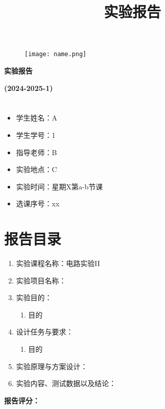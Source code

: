 \documentclass[12pt,a4paper]{ctexart}
\title{实验报告}
\date{}
\begin{document}
\begin{figure}[H]
    \centering
    \texttt{[image: name.png]} %
\end{figure}

\begin{center}
    \begin{Huge}
        \textbf{实\hspace{2cm}验\hspace{2cm}报\hspace{2cm}告}
    \end{Huge}
\end{center}

\begin{center}
    \textbf{(2024-2025-1)}
\end{center}

\section*{}
\begin{itemize}[leftmargin=*]
    \item 学生姓名：A
    \item 学生学号：1
    \item 指导老师：B
    \item 实验地点：C
    \item 实验时间：星期X第a-b节课
    \item 选课序号：xx
\end{itemize}

\section*{报告目录}
\begin{enumerate}[label=\chinese*.]
    \item 实验课程名称：电路实验II
    \item 实验项目名称：\hrulefill %
    \item 实验目的：
        \begin{enumerate}[label=\arabic*.]
            \item 目的
        \end{enumerate}
    \item 设计任务与要求：
        \begin{enumerate}[label=\arabic*.]
            \item 目的
        \end{enumerate}
    \item 实验原理与方案设计：
    \item 实验内容、测试数据以及结论：
\end{enumerate}

\noindent\vfill %
\hfill %
\textbf{报告评分：}\hrulefill %

\end{document}
